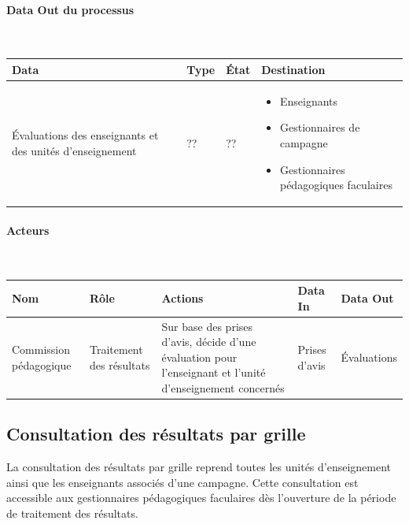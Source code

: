 \documentclass[a4paper,11pt]{report}
\begin{document}
\paragraph{Data Out du processus}~\newline{}

\begin{tabularx}{\linewidth}{|X|X|X|X|} \hline
Data & Type & État & Destination \\ \hline
Évaluations des enseignants et des unités d'enseignement & ?? & ?? & 
\begin{itemize}
	\item Enseignants
	\item Gestionnaires de campagne
	\item Gestionnaires pédagogiques faculaires
\end{itemize}
\\ \hline
\end{tabularx}

\paragraph{Acteurs}~\newline{}

\begin{tabularx}{\linewidth}{|X|X|X|X|X|} \hline
Nom & Rôle & Actions & Data In & Data Out \\ \hline 
Commission pédagogique & Traitement des résultats & Sur base des prises d'avis, décide d'une évaluation pour l'enseignant et l'unité d'enseignement concernés & Prises d'avis & Évaluations \\ \hline
\end{tabularx}






\subsection{Consultation des résultats par grille}

La consultation des résultats par grille reprend toutes les unités d'enseignement ainsi que les enseignants associés d'une campagne.
Cette consultation est accessible aux gestionnaires pédagogiques faculaires dès l'ouverture de la période de traitement des résultats.
\end{document}
